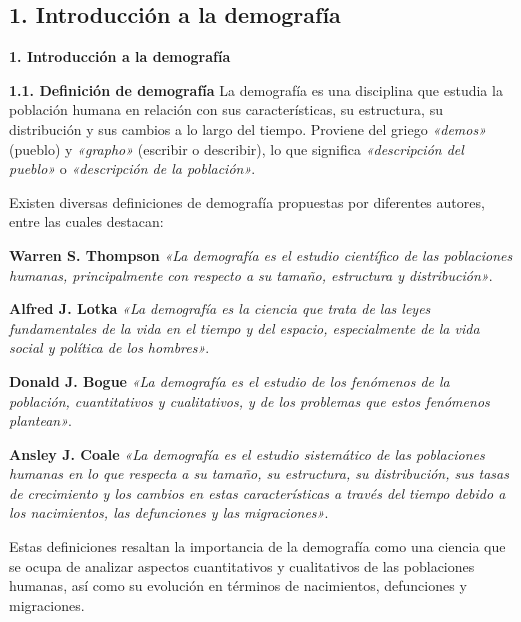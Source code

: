\documentclass[8pt,a4paper]{beamer}
\begin{document}
{\subsection{1. Introducción a la demografía}
\begin{frame}{\textbf{1. Introducción a la demografía}}
\setlength{\parskip}{3px}
\begin{block}{\textbf{1.1. Definición de demografía}}
\justifying
La demografía es una disciplina que estudia la población humana en relación con sus características, su estructura, su distribución y sus cambios a lo largo del tiempo. Proviene del griego \textit{«demos»} (pueblo) y \textit{«grapho»} (escribir o describir), lo que significa \textit{«descripción del pueblo»} o \textit{«descripción de la población»}.
\end{block}
Existen diversas definiciones de demografía propuestas por diferentes autores, entre las cuales destacan:
\begin{block}{\textbf{ Warren S. Thompson}}
\justifying
\textit{«La demografía es el estudio científico de las poblaciones humanas, principalmente con respecto a su tamaño, estructura y distribución»}.
\end{block}
\begin{block}{\textbf{ Alfred J. Lotka}}
\justifying
\textit{«La demografía es la ciencia que trata de las leyes fundamentales de la vida en el tiempo y del espacio, especialmente de la vida social y política de los hombres»}.
\end{block}

\end{frame}

\begin{frame}{}
\begin{block}{\textbf{ Donald J. Bogue}}
\justifying
\textit{«La demografía es el estudio de los fenómenos de la población, cuantitativos y cualitativos, y de los problemas que estos fenómenos plantean»}.
\end{block}
\begin{block}{\textbf{ Ansley J. Coale}}
\justifying
\textit{«La demografía es el estudio sistemático de las poblaciones humanas en lo que respecta a su tamaño, su estructura, su distribución, sus tasas de crecimiento y los cambios en estas características a través del tiempo debido a los nacimientos, las defunciones y las migraciones»}.
\end{block}

Estas definiciones resaltan la importancia de la demografía como una ciencia que se ocupa de analizar aspectos cuantitativos y cualitativos de las poblaciones humanas, así como su evolución en términos de nacimientos, defunciones y migraciones.


\end{frame}}
\end{document}
